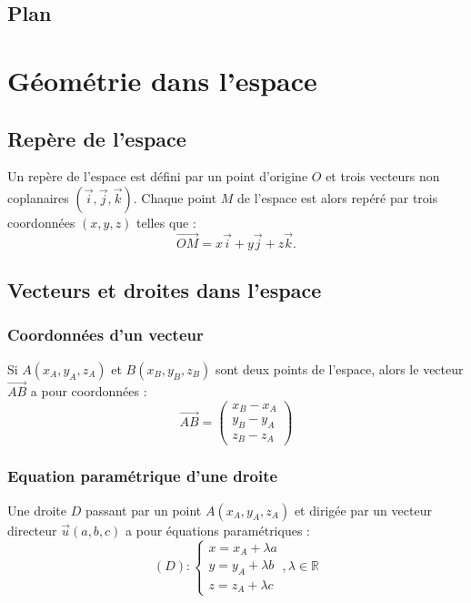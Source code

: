 \documentclass{report}
\begin{document}
    \subsection{Plan}
    \fi
    \section{Géométrie dans l'espace}

    \subsection{Repère de l'espace}
    Un repère de l'espace est défini par un point d'origine $O$ et trois vecteurs non coplanaires $(\overrightarrow{i}, \overrightarrow{j}, \overrightarrow{k})$. Chaque point $M$ de l'espace est alors repéré par trois coordonnées $(x, y, z)$ telles que :
    \[
    \overrightarrow{OM} = x \overrightarrow{i} + y \overrightarrow{j} + z \overrightarrow{k}.
    \]

    \subsection{Vecteurs et droites dans l'espace}
    \subsubsection{Coordonnées d'un vecteur}
    Si $A(x_A, y_A, z_A)$ et $B(x_B, y_B, z_B)$ sont deux points de l'espace, alors le vecteur $\overrightarrow{AB}$ a pour coordonnées :
    \[
    \overrightarrow{AB} = \begin{pmatrix}
      x_B - x_A\\
      y_B - y_A\\
      z_B - z_A

    \end{pmatrix}
    \]

    \subsubsection{Equation paramétrique d'une droite}
    Une droite $D$ passant par un point $A(x_A, y_A, z_A)$ et dirigée par un vecteur directeur $\overrightarrow{u} (a, b, c)$ a pour \'{e}quations paramétriques :
    \[ (D) : 
    \begin{cases}
      x = x_A + \lambda a \\
      y = y_A + \lambda b \\
      z = z_A + \lambda c
    \end{cases}
    , \lambda \in \mathbb{R}
    \]
\end{document}
